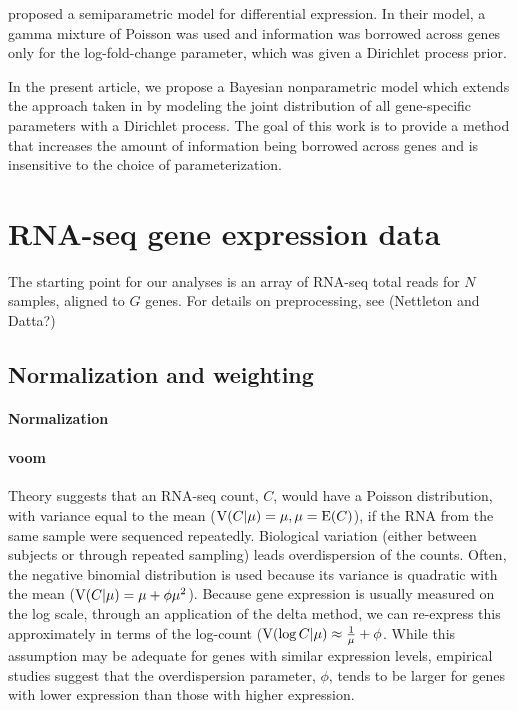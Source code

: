 \citet{liu} proposed a semiparametric model for differential expression. In their model, a gamma mixture of Poisson was used and information was borrowed across genes only for the log-fold-change parameter, which was given a Dirichlet process prior.

In the present article, we propose a Bayesian nonparametric model which extends the approach taken in \citet{liu} by modeling the joint distribution of all gene-specific parameters with a Dirichlet process. The goal of this work is to provide a method that increases the amount of information being borrowed across genes and is insensitive to the choice of parameterization.


\section{RNA-seq gene expression data}
\label{sec:data}
The starting point for our analyses is an array of RNA-seq total reads for $N$ samples, aligned to $G$ genes. For details on preprocessing, see (Nettleton and Datta?) 

\subsection{Normalization and weighting}
\paragraph{Normalization}


\paragraph{voom}
Theory suggests that an RNA-seq count, $C$, would have a Poisson distribution, with variance equal to the mean ($\operatorname{V}(C|\mu)=\mu, \mu=\operatorname{E}(C)$), if the RNA from the same sample were sequenced repeatedly. Biological variation (either between subjects or through repeated sampling) leads overdispersion of the counts. Often, the negative binomial distribution is used because its variance is quadratic with the mean ($\operatorname{V}(C|\mu)=\mu+\phi\mu^2$). Because gene expression is usually measured on the log scale, through an application of the delta method, we can re-express this approximately in terms of the log-count ($\operatorname{V}(\log C|\mu) \approx \frac{1}{\mu} + \phi$. While this assumption may be adequate for genes with similar expression levels, empirical studies suggest that the overdispersion parameter, $\phi$, tends to be larger for genes with lower expression than those with higher expression.

